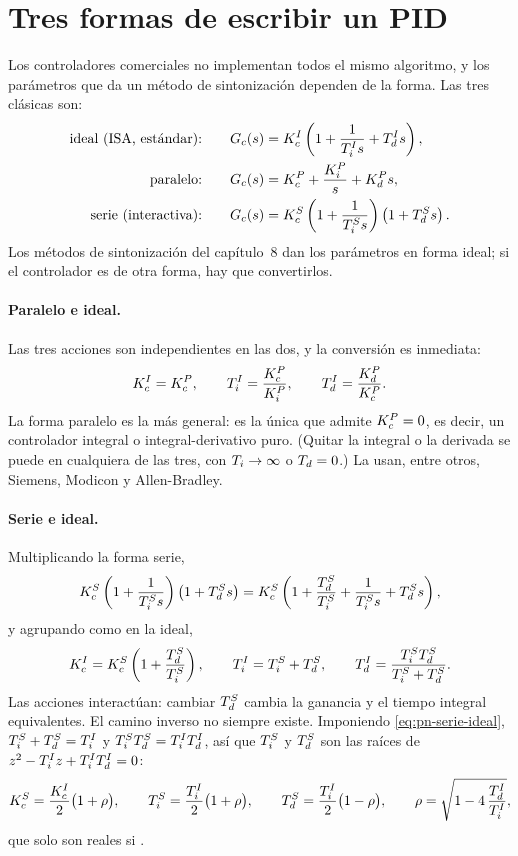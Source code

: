 \section{Tres formas de escribir un PID}
\label{sec:pn-estructuras}

Los controladores comerciales no implementan todos el mismo algoritmo, y los parámetros que da un método de sintonización dependen de la forma. Las tres clásicas son:
\begin{align}
  \text{ideal (ISA, estándar):}\qquad & G_c(s)=K_c^I\left(1+\frac{1}{T_i^I s}+T_d^I s\right), \label{eq:pn-forma-ideal}\\
  \text{paralelo:}\qquad & G_c(s)=K_c^P+\frac{K_i^P}{s}+K_d^P s, \label{eq:pn-forma-paralelo}\\
  \text{serie (interactiva):}\qquad & G_c(s)=K_c^S\left(1+\frac{1}{T_i^S s}\right)\left(1+T_d^S s\right). \label{eq:pn-forma-serie}
\end{align}
Los métodos de sintonización del capítulo~8 dan los parámetros en forma ideal; si el controlador es de otra forma, hay que convertirlos.

\paragraph{Paralelo e ideal.} Las tres acciones son independientes en las dos, y la conversión es inmediata:
\[
  K_c^I=K_c^P,\qquad T_i^I=\frac{K_c^P}{K_i^P},\qquad T_d^I=\frac{K_d^P}{K_c^P}.
\]
La forma paralelo es la más general: es la única que admite $K_c^P=0$, es decir, un controlador integral o integral-derivativo puro. (Quitar la integral o la derivada se puede en cualquiera de las tres, con $T_i\to\infty$ o $T_d=0$.) La usan, entre otros, Siemens, Modicon y Allen-Bradley.

\paragraph{Serie e ideal.} Multiplicando la forma serie,
\[
  K_c^S\left(1+\frac{1}{T_i^S s}\right)\left(1+T_d^S s\right)
  =K_c^S\left(1+\frac{T_d^S}{T_i^S}+\frac{1}{T_i^S s}+T_d^S s\right),
\]
y agrupando como en la ideal,
\begin{equation}
  K_c^I=K_c^S\left(1+\frac{T_d^S}{T_i^S}\right),\qquad
  T_i^I=T_i^S+T_d^S,\qquad
  T_d^I=\frac{T_i^ST_d^S}{T_i^S+T_d^S}.
  \label{eq:pn-serie-ideal}
\end{equation}
Las acciones interactúan: cambiar $T_d^S$ cambia la ganancia y el tiempo integral equivalentes. El camino inverso no siempre existe. Imponiendo \eqref{eq:pn-serie-ideal}, $T_i^S+T_d^S=T_i^I$ y $T_i^ST_d^S=T_i^IT_d^I$, así que $T_i^S$ y $T_d^S$ son las raíces de $z^2-T_i^Iz+T_i^IT_d^I=0$:
\begin{equation}
  K_c^S=\frac{K_c^I}{2}\bigl(1+\rho\bigr),\qquad
  T_i^S=\frac{T_i^I}{2}\bigl(1+\rho\bigr),\qquad
  T_d^S=\frac{T_i^I}{2}\bigl(1-\rho\bigr),\qquad
  \rho=\sqrt{1-4\,\frac{T_d^I}{T_i^I}} ,
  \label{eq:pn-ideal-serie}
\end{equation}
que solo son reales si .

